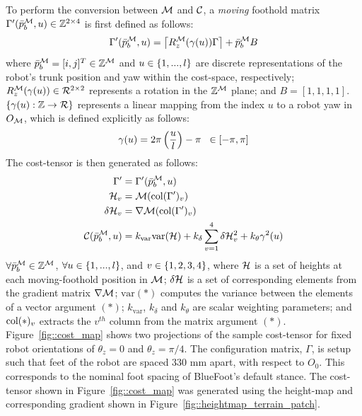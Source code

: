 			To perform the conversion between ${\cal M}$ and ${\cal C}$, a \emph{moving} foothold matrix $\Gamma'(\bar{p}^{{\cal M}}_{b},u) \in {\Bbb Z}^{2\times4}$ is first defined as follows:
				\begin{equation}
					\Gamma'(\bar{p}^{{\cal M}}_{b},u) = \left\lceil R_{z}^{{\cal M}}(\gamma(u))\Gamma \right\rceil + \bar{p}^{{\cal M}}_{b} B \\
					\label{eq::rel_feet}
				\end{equation}
			where  $\bar{p}^{{\cal M}}_{b} = [i,j]^T\in{\Bbb Z}^{{\cal M}}$ and $u \in \left\{1,...,l\right\}$ are discrete representations of the robot's trunk position and yaw within the cost-space, respectively; $R_{z}^{{\cal M}}(\gamma(u))\in{\cal R}^{2\times2}$ represents a rotation in the ${\Bbb Z}^{{\cal M}}$ plane; and $B = [1,1,1,1]$. $\left\{\gamma(u) : {\Bbb Z} \rightarrow {\cal R} \right\}$ represents a linear mapping from the index $u$ to a robot yaw in $O_{{\cal M}}$, which is defined explicitly as follows:
				\begin{equation} 
					\gamma(u) = 2\pi\left(\frac{u}{l}\right) - \pi \hspace{2mm} \in [-\pi,\pi]
					\label{eq::gamma}
				\end{equation}
			The cost-tensor is then generated as follows:
				\begin{equation}
					\begin{split}
						\Gamma'	 					&= \Gamma'(\bar{p}^{{\cal M}}_{b},u)  \\
						{\cal H}_{v} 			&=		{\cal M}(\text{col}(\Gamma')_{v})	 \\
						\delta {\cal H}_{v} 	&= 		\nabla {\cal M}(\text{col}(\Gamma')_{v}) \\
						{\cal C}(\bar{p}^{{\cal M}}_{b},u) 	&= k_{\text{var}} \text{var}({\cal H}) + k_{\delta}\sum_{v=1}^{4} \delta {\cal H}_{v}^{2} + k_{\theta} \gamma^{2}(u) 
					\end{split}
				\end{equation}
			$\forall \bar{p}^{{\cal M}}_{b} \in \mathbb{Z}^{{\cal M}}$, $\forall u \in \left\{1,...,l\right\}$, and  $v \in \left\{1,2,3,4\right\}$, where ${\cal H}$ is a set of heights at each moving-foothold position in ${\cal M}$; $\delta{\cal H}$ is a set of corresponding elements from the gradient matrix $\nabla {\cal M}$; $\text{var}(*)$ computes the variance between the elements of a vector argument $(*)$; $k_{\text{var}}$, $k_{\delta}$ and $k_{\theta}$ are scalar weighting parameters; and $\text{col}(*)_{v}$ extracts the $v^{th}$ column from the matrix argument $(*)$. Figure~\ref{fig::cost_map} shows two projections of the sample cost-tensor for fixed robot orientations of $\theta_{z}=0$ and $\theta_{z}=\pi/4$. The configuration matrix, $\Gamma$, is setup such that feet of the robot are spaced $330\text{ mm}$ apart, with respect to $O_{0}$. This corresponds to the nominal foot spacing of BlueFoot's default stance. The cost-tensor shown in Figure~\ref{fig::cost_map} was generated using the height-map and corresponding gradient shown in Figure~\ref{fig::heightmap_terrain_patch}.

